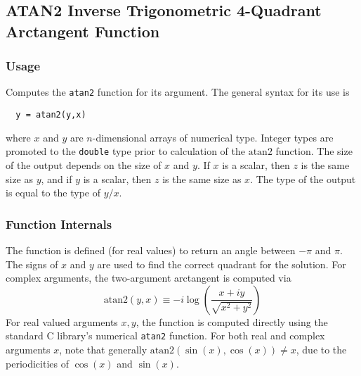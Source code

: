 %
%
%
\subsection{ATAN2 Inverse Trigonometric 4-Quadrant Arctangent Function}
\subsubsection{Usage}
Computes the \verb|atan2| function for its argument.  The general
syntax for its use is
\begin{verbatim}
  y = atan2(y,x)
\end{verbatim}
where $x$ and $y$ are $n$-dimensional arrays of numerical type.
Integer types are promoted to the \verb|double| type prior to
calculation of the $\mathrm{atan2}$ function. The size of the output depends
on the size of $x$ and $y$.  If $x$ is a scalar, then $z$
is the same size as $y$, and if $y$ is a scalar, then $z$
is the same size as $x$.  The type of the output is equal to the type of
$y/x$.  
\subsubsection{Function Internals}
The function is defined (for real values) to return an 
angle between $-\pi$ and $\pi$.  The signs of $x$ and $y$
are used to find the correct quadrant for the solution.  For complex
arguments, the two-argument arctangent is computed via
\[
  \mathrm{atan2}(y,x) \equiv -i \log\left(\frac{x+i y}{\sqrt{x^2+y^2}} \right)
\]
For real valued arguments $x,y$, the function is computed directly using 
the standard C library's numerical \verb|atan2| function. For both 
real and complex arguments $x$, note that generally
$\mathrm{atan2}(\sin(x),\cos(x)) \neq x$, due to the periodicities of 
$\cos(x)$ and $\sin(x)$.
